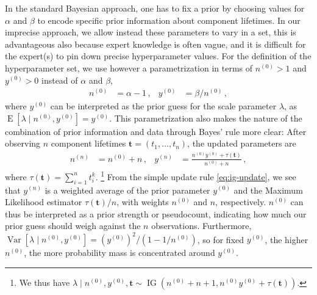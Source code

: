 \documentclass[12pt,a4paper,twocolumn,fleqn]{narms}
\renewcommand{\vec}[1]{{\bm#1}}
\newcommand{\uz}{^{(0)}} %
\newcommand{\un}{^{(n)}} %
\newcommand{\E}{\operatorname{E}}
\newcommand{\V}{\operatorname{Var}}
\newcommand{\ig}{\operatorname{IG}}   %
\def\yz{y\uz}
\def\yn{y\un}
\def\nz{n\uz}
\def\nn{n\un}
\def\taut{\tau(\vec{t})}
\begin{document}
In the standard Bayesian approach, 
one has to fix a prior by choosing values for $\alpha$ and $\beta$
to encode specific prior information about component lifetimes.
In our imprecise approach, we allow instead these parameters
to vary in a set, this is advantageous also
because expert knowledge is often vague,
and it is difficult for the expert(s) to pin down precise hyperparameter values.
For the definition of the hyperparameter set,
we use however a parametrization in terms of $\nz > 1$ and $\yz > 0$ instead of $\alpha$ and $\beta$,
\begin{align}
\nz &= \alpha - 1\,,
&
\yz &= \beta / \nz \,,
\end{align}
where $\yz$ can be interpreted as the prior guess for the scale parameter $\lambda$,
as $\E[\lambda\mid\nz,\yz] = \yz$.
This parametrization also makes the nature of the combination
of prior information and data through Bayes' rule more clear:
After observing $n$ component lifetimes $\vec{t} = (t_1, \ldots, t_n)$,
the updated parameters are
\begin{align}
\nn &= \nz + n\,, 
&
\yn &=  \frac{\nz \yz + \taut}{\nz + n}\,,
\label{eq:ig-update}
\end{align}
where $\taut = \sum_{i=1}^n t_i^k$.%
\footnote{We thus have
$\lambda \mid \nz, \yz, \vec{t} \sim \ig(\nz + n + 1, \nz \yz + \taut)$.}
From the simple update rule \eqref{eq:ig-update}, we see that
$\yn$ is a weighted average of the prior parameter $\yz$ and the Maximum Likelihood estimator $\taut/n$,
with weights $\nz$ and $n$, respectively.
$\nz$ can thus be interpreted as a prior strength or pseudocount,
indicating how much our prior guess should weigh against the $n$ observations.
Furthermore, $\V[\lambda\mid\nz,\yz] = (\yz)^2 / (1 - 1/\nz)$,
so for fixed $\yz$, the higher $\nz$,
the more probability mass is concentrated around $\yz$. %
\end{document}
